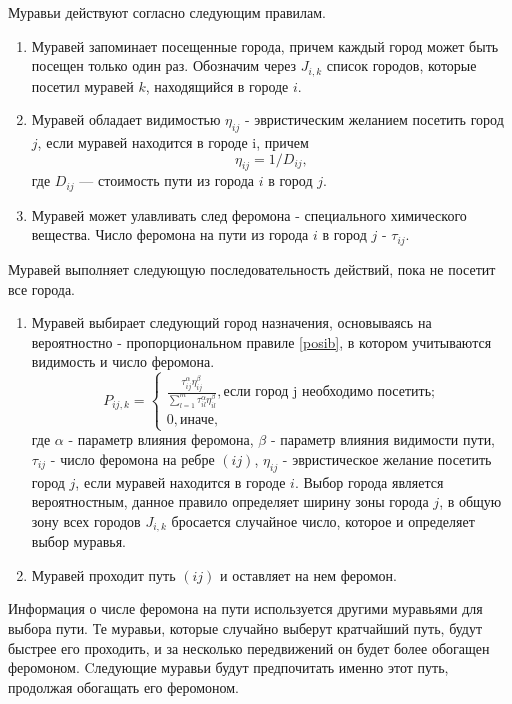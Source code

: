 Муравьи действуют согласно следующим правилам.
\begin{enumerate}
	\item Муравей запоминает посещенные города, причем каждый город может быть посещен только один раз. Обозначим через $J_{i,k}$ список городов, которые посетил муравей $k$, находящийся в городе $i$.
	\item Муравей обладает видимостью $\eta_{ij}$ - эвристическим желанием посетить город $j$, если муравей находится в городе i, причем
\begin{equation}
	\label{d_func}
	\eta_{ij} = 1 / D_{ij},
\end{equation}
где $D_{ij}$ — стоимость пути из города $i$ в город $j$.
	\item Муравей может улавливать след феромона - специального химического вещества. Число феромона на пути из города $i$ в город $j$ - $\tau_{ij}$.
\end{enumerate}

Муравей выполняет следующую последовательность действий, пока не посетит все города.
\begin{enumerate}
	\item Муравей выбирает следующий город назначения, основываясь на вероятностно - пропорциональном правиле \eqref{posib}, в котором учитываются видимость и число феромона.
\begin{equation}
	\label{posib}
	P_{ij, k} = \begin{cases}
		\frac{\tau_{ij}^\alpha\eta_{ij}^\beta}{\sum_{l=1}^m \tau^\alpha_{il}\eta^\beta_{il}}, \textrm{если город j необходимо посетить;} \\
		0, \textrm{иначе,}
	\end{cases}
\end{equation}
где $\alpha$ - параметр влияния феромона, $\beta$ - параметр влияния видимости пути, $\tau_{ij}$ - число феромона на ребре $(ij)$, $\eta_{ij}$ - эвристическое желание посетить город $j$, если муравей находится в городе $i$. Выбор города является вероятностным, данное правило определяет ширину зоны города $j$, в общую зону всех городов $J_{i,k}$ бросается случайное число, которое и определяет выбор муравья.
	\item Муравей проходит путь $(ij)$ и оставляет на нем феромон.
\end{enumerate}

Информация о числе феромона на пути используется другими муравьями для выбора пути. Те муравьи, которые случайно выберут кратчайший путь, будут быстрее его проходить, и за несколько передвижений он будет более обогащен феромоном. Cледующие муравьи будут предпочитать именно этот путь, продолжая обогащать его феромоном. 

